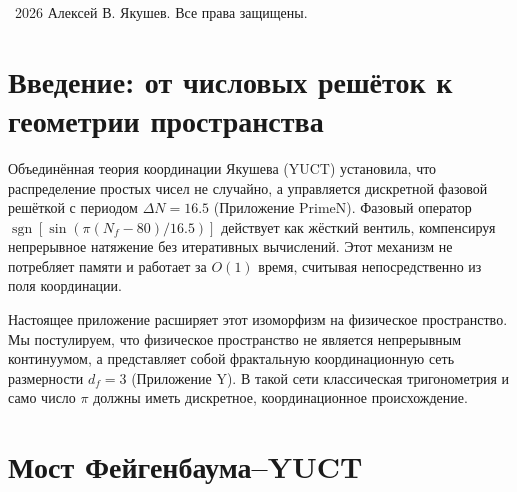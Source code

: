 \documentclass[12pt,a4paper]{article}
\newcommand{\df}{d_{\!f}}  %
\begin{document}
\begin{titlepage}
\begin{abstract}
			Мы представляем полноценный невычислительный навигационный движок \texttt{yuct\_constants.py v4.0}, который одновременно извлекает $\pi$ (статическое и динамическое), постоянную тонкой структуры, кандидата в $n$-е простое число через фазовый механизм, фрактальные критические точки и биологические коэффициенты кручения. Движок выполняется за $\sim 255\ \mu\text{s}$ с нулевым потреблением динамической памяти, что идеально иллюстрирует парадигму извлечения $O(1)$. Каждое значение получается непосредственно из алгебраической петли без итераций, демонстрируя, что фундаментальные константы природы не вычисляются, а \emph{считываются} из жёсткой координационной решётки вакуума.
		\end{abstract}
		
		\vspace{0.5cm}
		\textcopyright\ 2026 Алексей В. Якушев. Все права защищены.
	\end{titlepage}
	
	\tableofcontents
	\newpage
	
	\section{Введение: от числовых решёток к геометрии пространства}
	
	Объединённая теория координации Якушева (YUCT) установила, что распределение простых чисел не случайно, а управляется дискретной фазовой решёткой с периодом $\Delta N = 16.5$ (Приложение PrimeN). Фазовый оператор $\operatorname{sgn}[\sin(\pi(N_f-80)/16.5)]$ действует как жёсткий вентиль, компенсируя непрерывное натяжение без итеративных вычислений. Этот механизм не потребляет памяти и работает за $O(1)$ время, считывая непосредственно из поля координации.
	
	Настоящее приложение расширяет этот изоморфизм на физическое пространство. Мы постулируем, что физическое пространство не является непрерывным континуумом, а представляет собой фрактальную координационную сеть размерности $\df=3$ (Приложение Y). В такой сети классическая тригонометрия и само число $\pi$ должны иметь дискретное, координационное происхождение.
	
	\section{Мост Фейгенбаума–YUCT}
	\label{sec:bridge}
	
\end{document}
